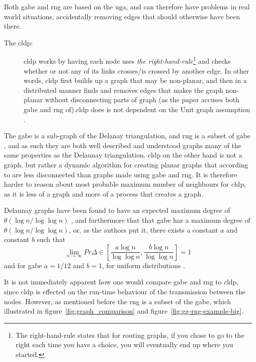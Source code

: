 Both \ac{gabe} and \ac{rng} are based on the \ac{uga}, and can therefore have problems in real world situations, accidentally removing edges that should otherwise have been there\cite{practical}.
\label{right-hand rule}
\begin{description}
\item[The \ac{cldp}:] \ac{cldp} works by having each node uses \emph{the right-hand-rule}\footnote{The right-hand-rule states that for routing graphs, if you chose to go to the right each time you have a choice, you will eventually end up where you started.} and checks whether or not any of its links crosses/is crossed by another edge. In other words, \ac{cldp} first builds up a graph that may be non-planar, and then in a distributed manner finds and removes edges that makes the graph non-planar without disconnecting parts of graph (as the paper accuses both \ac{gabe} and \ac{rng} of).\ac{cldp} does is not dependent on the Unit graph assumption \cite{practical}. 
\end{description}

The \ac{gabe} is a sub-graph of the Delanay triangulation, and \ac{rng} is a subset of \ac{gabe} , and as such they are both well described and understood graphs many of the same properties as the Delaunay triangulation. \ac{cldp} on the other hand is not a graph, but rather a dynamic algorithm for creating planar graphs that according to \cite{practical} are less disconnected than graphs made using \ac{gabe} and \ac{rng}. It is therefore harder to reason about most probable maximum number of neighbours for \ac{cldp}, as it is less of a graph and more of a process that creates a graph. 


Delaunay graphs have been found to have an expected maximum degree of $\theta(\log n / \log \log n)$ \cite{delExpected}, and furthermore that that \ac{gabe} has a maximum degree of $\theta(\log n / \log \log n)$, or, as the authors put it, there exists a constant $a$ and constant $b$ such that 
$$
\lim_{n \rightarrow \infty} Pr{\Delta \in [\frac{a\log n}{\log \log n}, \frac{b\log n}{\log \log n}]} = 1
$$
and for \ac{gabe} $a = 1/12$ and $b = 1$, for uniform distributions \cite{GGExpected}.

It is not immediately apparent how one would compare \ac{gabe} and \ac{rng} to \ac{cldp}, since \ac{cldp} is effected on the run-time behaviour of the transmission between the nodes. However, as mentioned before the \ac{rng} is a subset of the \ac{gabe}, which illustrated in figure~\ref{fig:graph_comparison} and figure~\ref{fig:gg-rng-example-big}.


